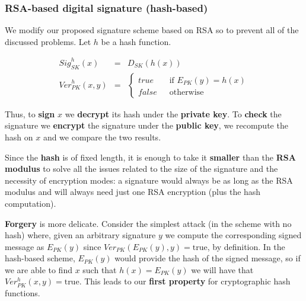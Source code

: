 \subsubsection{RSA-based digital signature (hash-based)}
We modify our proposed signature scheme based on RSA so to prevent all of the discussed problems. Let $h$ be a hash function.

$$\begin{array}{rcl}\mathit{Sig}^h_{SK}(x) &= &D_{SK}(h(x))\\[.3cm] \mathit{Ver}^h_{PK}(x,y) &=& \left\{ \begin{array}{ll}true ~~~~~ & \mbox{if } E_{PK}(y) = h(x)\\false & \mbox{otherwise}\end{array}\right.\end{array}$$

Thus, to \textbf{sign} $x$ we \textbf{decrypt} its hash under the \textbf{private key}. To \textbf{check} the signature we \textbf{encrypt} the signature under the \textbf{public key}, we recompute the hash on $x$ and we compare the two results.

Since the \textbf{hash} is of fixed length, it is enough to take it \textbf{smaller} than the \textbf{RSA modulus} to solve all the issues related to the size of the signature and the necessity of encryption modes: a signature would always be as long as the RSA modulus and will always need just one RSA encryption (plus the hash computation).

\textbf{Forgery} is more delicate. Consider the simplest attack (in the scheme with no hash) where, given an arbitrary signature $y$ we compute the corresponding signed message as $E_{PK}(y)$ since $Ver_{PK}(E_{PK}(y),y) = \text{true}$, by definition. In the hash-based scheme, $E_{PK}(y)$ would provide the hash of the signed message, so if we are able to find $x$ such that $h(x) = E_{PK}(y)$ we will have that $Ver^h_{PK}(x,y) = \text{true}$. This leads to our \textbf{first property} for cryptographic hash functions.



